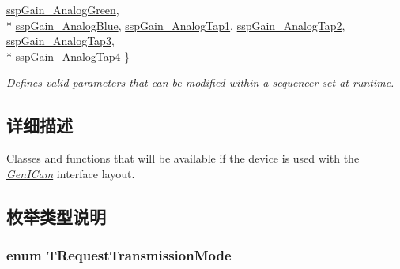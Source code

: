\begin{DoxyCompactItemize}
\hyperlink{group___gen_i_cam_interface_gga458c2281fb19ba32fa6a49b02e0a976dafe6e1cd96f7ac7fbfea2a50ef8ced41a}{ssp\+Gain\+\_\+\+Analog\+Green}, 
\\*
\hyperlink{group___gen_i_cam_interface_gga458c2281fb19ba32fa6a49b02e0a976da03e16ad2b8287894218a642da693d20e}{ssp\+Gain\+\_\+\+Analog\+Blue}, 
\hyperlink{group___gen_i_cam_interface_gga458c2281fb19ba32fa6a49b02e0a976da37ebd5c403c0abf1379280f9b7b6e22f}{ssp\+Gain\+\_\+\+Analog\+Tap1}, 
\hyperlink{group___gen_i_cam_interface_gga458c2281fb19ba32fa6a49b02e0a976da79911fe4a88877b0e84acd913fcefcda}{ssp\+Gain\+\_\+\+Analog\+Tap2}, 
\hyperlink{group___gen_i_cam_interface_gga458c2281fb19ba32fa6a49b02e0a976da3e13b1302e61acfc34fbc761b9baa0a8}{ssp\+Gain\+\_\+\+Analog\+Tap3}, 
\\*
\hyperlink{group___gen_i_cam_interface_gga458c2281fb19ba32fa6a49b02e0a976daf702df1286b84779f39ba3f1da973dd7}{ssp\+Gain\+\_\+\+Analog\+Tap4}
 \}
\begin{DoxyCompactList}\small\item\em Defines valid parameters that can be modified within a sequencer set at runtime. \end{DoxyCompactList}\end{DoxyCompactItemize}


\subsection{详细描述}
Classes and functions that will be available if the device is used with the {\itshape \hyperlink{namespacemv_i_m_p_a_c_t_1_1acquire_1_1_gen_i_cam}{Gen\+I\+Cam}} interface layout. 



\subsection{枚举类型说明}
\hypertarget{group___gen_i_cam_interface_ga5817a4e9c4ac30a320103ae1cec95cb9}{
\subsubsection[{T\+Request\+Transmission\+Mode}]{\setlength{\rightskip}{0pt plus 5cm}enum {\bf T\+Request\+Transmission\+Mode}}}\label{group___gen_i_cam_interface_ga5817a4e9c4ac30a320103ae1cec95cb9}


